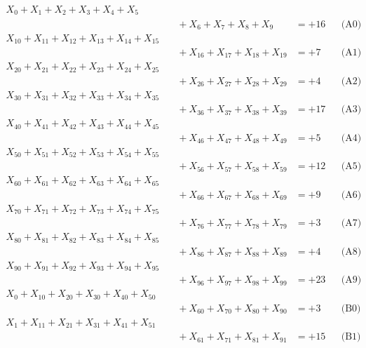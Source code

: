 \documentclass[a4paper,10pt]{article}
\begin{document}
\allowdisplaybreaks
{\small
\begin{align}
X_{0} + X_{1} + X_{2} + X_{3} + X_{4} + X_{5} \\[0.1ex]
&\quad  + X_{6} + X_{7} + X_{8} + X_{9} &= +16 && \text{(A0)} \\
X_{10} + X_{11} + X_{12} + X_{13} + X_{14} + X_{15} \\[0.1ex]
&\quad  + X_{16} + X_{17} + X_{18} + X_{19} &= +7 && \text{(A1)} \\
X_{20} + X_{21} + X_{22} + X_{23} + X_{24} + X_{25} \\[0.1ex]
&\quad  + X_{26} + X_{27} + X_{28} + X_{29} &= +4 && \text{(A2)} \\
X_{30} + X_{31} + X_{32} + X_{33} + X_{34} + X_{35} \\[0.1ex]
&\quad  + X_{36} + X_{37} + X_{38} + X_{39} &= +17 && \text{(A3)} \\
X_{40} + X_{41} + X_{42} + X_{43} + X_{44} + X_{45} \\[0.1ex]
&\quad  + X_{46} + X_{47} + X_{48} + X_{49} &= +5 && \text{(A4)} \\
\allowbreak
X_{50} + X_{51} + X_{52} + X_{53} + X_{54} + X_{55} \\[0.1ex]
&\quad  + X_{56} + X_{57} + X_{58} + X_{59} &= +12 && \text{(A5)} \\
X_{60} + X_{61} + X_{62} + X_{63} + X_{64} + X_{65} \\[0.1ex]
&\quad  + X_{66} + X_{67} + X_{68} + X_{69} &= +9 && \text{(A6)} \\
X_{70} + X_{71} + X_{72} + X_{73} + X_{74} + X_{75} \\[0.1ex]
&\quad  + X_{76} + X_{77} + X_{78} + X_{79} &= +3 && \text{(A7)} \\
X_{80} + X_{81} + X_{82} + X_{83} + X_{84} + X_{85} \\[0.1ex]
&\quad  + X_{86} + X_{87} + X_{88} + X_{89} &= +4 && \text{(A8)} \\
X_{90} + X_{91} + X_{92} + X_{93} + X_{94} + X_{95} \\[0.1ex]
&\quad  + X_{96} + X_{97} + X_{98} + X_{99} &= +23 && \text{(A9)} \\
\allowbreak
X_{0} + X_{10} + X_{20} + X_{30} + X_{40} + X_{50} \\[0.1ex]
&\quad  + X_{60} + X_{70} + X_{80} + X_{90} &= +3 && \text{(B0)} \\
X_{1} + X_{11} + X_{21} + X_{31} + X_{41} + X_{51} \\[0.1ex]
&\quad  + X_{61} + X_{71} + X_{81} + X_{91} &= +15 && \text{(B1)} \\

\end{align}}
\end{document}
